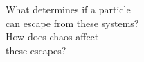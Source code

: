 \documentclass[preview]{standalone}
\begin{document}
What determines if a particle\\ can escape from these systems?\\How does chaos affect\\ these escapes?\\
\end{document}
